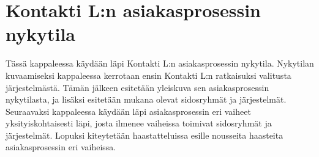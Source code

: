 \documentclass[finnish,12pt,a4paper,pdftex]{article}
\begin{document}



\section{Kontakti L:n asiakasprosessin nykytila}

Tässä kappaleessa käydään läpi Kontakti L:n asiakasprosessin nykytila. Nykytilan kuvaamiseksi kappaleessa kerrotaan ensin Kontakti L:n ratkaisuksi valitusta järjestelmästä. Tämän jälkeen esitetään yleiskuva sen asiakasprosessin nykytilasta, ja lisäksi esitetään mukana olevat sidosryhmät ja järjestelmät. Seuraavaksi kappaleessa käydään läpi asiakasprosessin eri vaiheet yksityiskohtaisesti läpi, josta ilmenee vaiheissa toimivat sidosryhmät ja järjestelmät. Lopuksi kiteytetään haastatteluissa esille nousseita haasteita asiakasprosessin eri vaiheissa.
\end{document}
